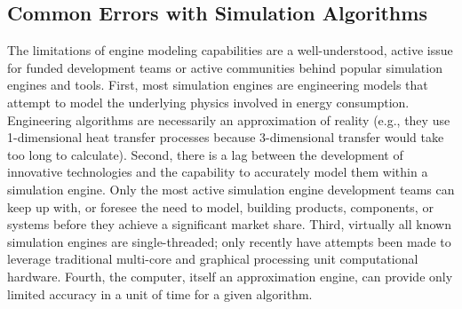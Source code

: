 \documentclass[preprint, review, 12pt]{elsarticle}
\begin{document}
\subsection{Common Errors with Simulation Algorithms}
The limitations of engine modeling capabilities are a well-understood, active issue for funded development teams or active communities behind popular simulation engines and tools. %
First, most simulation engines are engineering models that attempt to model the underlying physics involved in energy consumption. Engineering algorithms are necessarily an approximation of reality (e.g., they use 1-dimensional heat transfer processes because 3-dimensional transfer would take too long to calculate). %
Second, there is a lag between the development of innovative technologies and the capability to accurately model them within a simulation engine. Only the most active simulation engine development teams can keep up with, or foresee the need to model, building products, components, or systems before they achieve a significant market share. %
Third, virtually all known simulation engines are single-threaded; only recently have attempts been made to leverage traditional multi-core and graphical processing unit computational hardware. %
Fourth, the computer, itself an approximation engine, can provide only limited accuracy in a unit of time for a given algorithm. %
\end{document}
